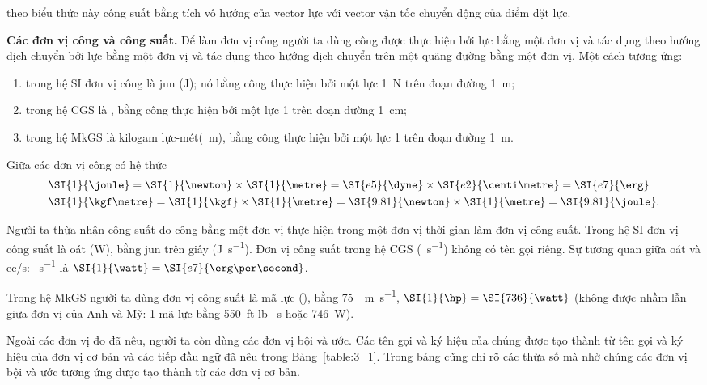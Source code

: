 \noindent
theo biểu thức này công suất bằng tích vô hướng của vector lực với vector vận tốc chuyển động của điểm đặt lực. 

\textbf{Các đơn vị công và công suất.} Để làm đơn vị công người ta dùng công được thực hiện bởi lực bằng một đơn vị và tác dụng theo hướng dịch chuyển bởi lực bằng một đơn vị và tác dụng theo hướng dịch chuyển trên một quãng đường bằng một đơn vị. Một cách tương ứng:
\begin{enumerate}[(1)]
	\item trong hệ SI đơn vị công là jun (\si{\joule}); nó bằng công thực hiện bởi một lực \SI{1}{\newton} trên đoạn đường \SI{1}{\metre};
	\item trong hệ CGS là  \si{\erg}, bằng công thực hiện bởi một lực \SI{1}{\dyne} trên đoạn đường \SI{1}{\centi\metre};
	\item trong hệ MkGS là kilogam lực-mét(\si{\kgf\metre}), bằng công thực hiện bởi một lực  \SI{1}{\kgf} trên đoạn đường \SI{1}{\metre}.
\end{enumerate}

Giữa các đơn vị công có hệ thức
\begin{align*}
&\SI{1}{\joule} = \SI{1}{\newton}\times\SI{1}{\metre} = \SI{e5}{\dyne}\times\SI{e2}{\centi\metre} = \SI{e7}{\erg}\\
&\SI{1}{\kgf\metre} = \SI{1}{\kgf}\times\SI{1}{\metre} = \SI{9.81}{\newton}\times\SI{1}{\metre} = \SI{9.81}{\joule}.
\end{align*}

Người ta thừa nhận công suất do công bằng một đơn vị thực hiện trong một đơn vị thời gian làm đơn vị công suất. Trong hệ SI đơn vị công suất là oát (\si{\watt}), bằng jun trên giây (\si{\joule\per\second}). Đơn vị công suất trong hệ CGS (\si{\erg\per\second}) không có tên gọi riêng. Sự tương quan giữa oát và ec/s: \si{\erg\per\second} là $\SI{1}{\watt}=\SI{e7}{\erg\per\second}$.

Trong hệ MkGS người ta dùng đơn vị công suất là mã lực (\si{\hp}), bằng \SI{75}{\kgf\metre\per\second}, $\SI{1}{\hp}=\SI{736}{\watt}$ (không được nhầm lẫn giữa đơn vị của Anh và Mỹ: 1 mã lực bằng \num{550}~ft-lb \si{\per\second} hoặc \SI{746}{\watt}).

Ngoài các đơn vị đo đã nêu, người ta còn dùng các đơn vị bội và ước. Các tên gọi và ký hiệu của chúng được tạo thành từ tên gọi và ký hiệu của đơn vị cơ bản và các tiếp đầu ngữ đã nêu trong Bảng~\ref{table:3_1}. Trong bảng cũng chỉ rõ các thừa số mà nhờ chúng các đơn vị bội và ước tương ứng được tạo thành từ các đơn vị cơ bản.

